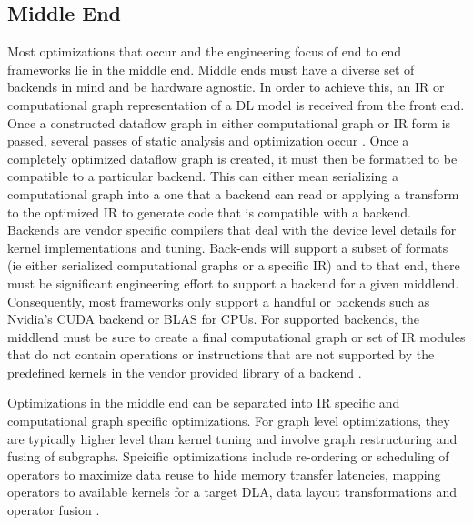 \subsection{Middle End}
Most optimizations that occur and the engineering focus of end to end
frameworks lie in the middle end. Middle ends must have a diverse set of
backends in mind and be hardware agnostic. In order to achieve this, an IR or
computational graph representation of a DL model is received from the front
end. Once a constructed dataflow graph in either computational graph or IR
form is passed, several passes of static analysis and optimization occur
\cite{TVM} \cite{DLVM} \cite{tensorflow}. Once a completely optimized dataflow
graph is created, it must then be formatted to be compatible to a particular
backend. This can either mean serializing a computational graph into a one
that a backend can read or applying a transform to the optimized IR to generate
code that is compatible with a backend. Backends are vendor specific compilers
that deal with the device level details for kernel implementations and tuning.
Back-ends will support a subset of formats (ie either serialized computational
graphs or a specific IR) and to that end, there must be significant engineering
effort to support a backend for a given middlend. Consequently, most frameworks
only support a handful or backends such as Nvidia's CUDA backend or BLAS for
CPUs. For supported backends, the middlend must be sure to create a final
computational graph or set of IR modules that do not contain operations or
instructions that are not supported by the predefined kernels in the vendor
provided library of a backend \cite{TVM}.

Optimizations in the middle end can be separated into IR specific and
computational graph specific optimizations. For graph level optimizations,
they are typically higher level than kernel tuning and involve graph
restructuring and fusing of subgraphs. Speicific optimizations include
re-ordering or scheduling of operators to maximize data reuse
to hide memory transfer latencies, mapping operators to available kernels
for a target DLA, data layout transformations and operator fusion \cite{TVM}.

